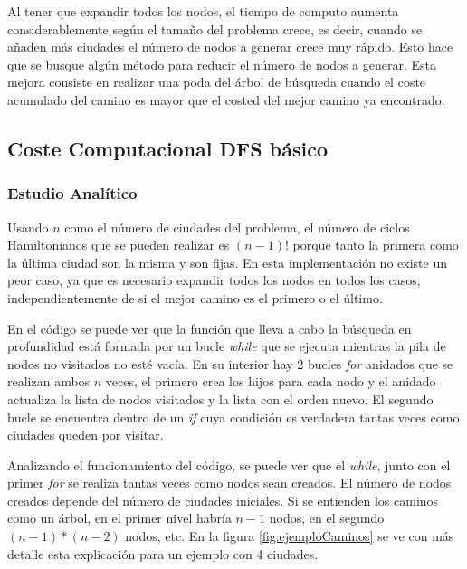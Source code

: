 \documentclass{uc3mpracticas}
\begin{document}
  Al tener que expandir todos los nodos, el tiempo de computo aumenta considerablemente según el tamaño del problema crece, es decir, cuando se añaden más ciudades el número de nodos a generar crece muy rápido. Esto hace que se busque algún método para reducir el número de nodos a generar. Esta mejora consiste en realizar una poda del árbol de búsqueda cuando el coste acumulado del camino es mayor que el costed del mejor camino ya encontrado.



  \subsection{Coste Computacional DFS básico}

  \subsubsection{Estudio Analítico}

  Usando $n$ como el número de ciudades del problema, el número de ciclos Hamiltonianos que se pueden realizar es $(n-1)!$ porque tanto la primera como la última ciudad son la misma y son fijas. En esta implementación no existe un peor caso, ya que es necesario expandir todos los nodos en todos los casos, independientemente de si el mejor camino es el primero o el último.

  \vspace{2mm}

  En el código se puede ver que la función que lleva a cabo la búsqueda en profundidad está formada por un bucle \textit{while} que se ejecuta mientras la pila de nodos no visitados no esté vacía. En su interior hay 2 bucles \textit{for} anidados que se realizan ambos $n$ veces, el primero crea los hijos para cada nodo y el anidado actualiza la lista de nodos visitados y la lista con el orden nuevo. El segundo bucle se encuentra dentro de un \textit{if} cuya condición es verdadera tantas veces como ciudades queden por visitar.

  \vspace{2mm}

  Analizando el funcionamiento del código, se puede ver que el \textit{while}, junto con el primer \textit{for} se realiza tantas veces como nodos sean creados. El número de nodos creados depende del número de ciudades iniciales. Si se entienden los caminos como un árbol, en el primer nivel habría $n-1$ nodos, en el segundo $(n-1)*(n-2)$ nodos, etc. En la figura \ref{fig:ejemploCaminos} se ve con más detalle esta explicación para un ejemplo con 4 ciudades.
\end{document}
